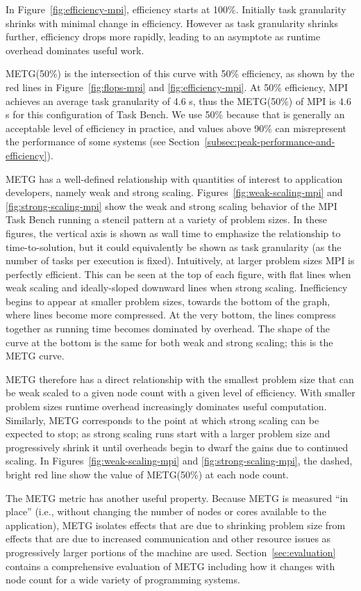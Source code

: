 In Figure~\ref{fig:efficiency-mpi},
efficiency starts at 100\%. Initially task granularity
shrinks with minimal change in efficiency. However as task
granularity shrinks further, efficiency drops more rapidly, leading
to an asymptote as runtime overhead dominates useful work.


METG(50\%) is the intersection of this curve with 50\% efficiency, as
shown by the red lines in Figure~\ref{fig:flops-mpi} and
\ref{fig:efficiency-mpi}. At 50\% efficiency, MPI achieves an average
task granularity of
4.6 \textmu{}s, thus the METG(50\%) of MPI is 4.6 \textmu{}s for this configuration of
Task Bench. We use 50\% because that is generally an acceptable level
of efficiency in practice, and values above 90\% can misrepresent the
performance of some systems (see
Section~\ref{subsec:peak-performance-and-efficiency}).




METG has a well-defined
relationship with quantities of interest to application developers,
namely weak and strong scaling. Figures~\ref{fig:weak-scaling-mpi} and
\ref{fig:strong-scaling-mpi} show the weak and strong scaling behavior of the MPI Task Bench running a stencil pattern at a variety of problem sizes. In these
figures, the vertical axis is shown as wall time to emphasize the
relationship to time-to-solution, but it could equivalently be shown
as task granularity (as the number of tasks per execution is
fixed). Intuitively, at
larger problem sizes MPI is perfectly efficient. This can be seen at
the top of each figure, with flat lines when weak scaling and
ideally-sloped downward lines when strong scaling. Inefficiency begins
to appear at smaller problem sizes, towards the bottom of the graph,
where lines become more compressed. At the
very bottom, the lines compress together as running time becomes dominated by overhead. The shape of the curve at the bottom is the same
for both weak and strong scaling; this is
the METG curve.

METG therefore has a direct relationship with the smallest problem
size that can be weak scaled to a given node count with a given level
of efficiency. With smaller problem sizes runtime overhead increasingly dominates useful
computation. Similarly, METG corresponds to the point at which strong
scaling can be expected to stop; as strong scaling runs start with a
larger problem size and progressively shrink it until overheads begin
to dwarf the gains due to continued scaling. In
Figures~\ref{fig:weak-scaling-mpi} and \ref{fig:strong-scaling-mpi},
the dashed, bright red line show the value of METG(50\%) at each node
count.

The METG metric has another useful property. Because METG is measured ``in place'' (i.e.,
without changing the number of nodes or cores available to the
application), METG isolates effects that are
due to shrinking problem size from effects that are due to
increased communication and other resource issues as
progressively larger portions of the machine are used. Section~\ref{sec:evaluation} contains a comprehensive evaluation of
METG including how it changes with node count for a wide variety of
programming systems.
